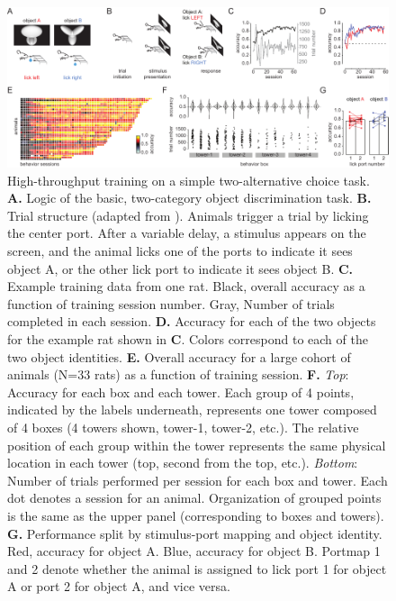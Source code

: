 \begin{figure}[t!]
    \includegraphics[width=\textwidth]{figures/chapter_1/fig_1-2_basic_training/fig_1-2_basic_training.pdf}
    \vspace{.1in}
    \caption[High-throughput training]{High-throughput training on a simple two-alternative choice task. 
    \textbf{A.} Logic of the basic, two-category object discrimination task. 
    \textbf{B.} Trial structure (adapted from \cite{Zoccolan2009}). Animals trigger a trial by licking the center port. After a variable delay, a stimulus appears on the screen, and the animal licks one of the ports to indicate it sees object A, or the other lick port to indicate it sees object B. 
    \textbf{C.} Example training data from one rat. Black, overall accuracy as a function of training session number. Gray, Number of trials completed in each session. 
    \textbf{D.} Accuracy for each of the two objects for the example rat shown in \textbf{C}. Colors correspond to each of the two object identities.
    \textbf{E.} Overall accuracy for a large cohort of animals (N=33 rats) as a function of training session. 
    \textbf{F.} \textit{Top}: Accuracy for each box and each tower. Each group of 4 points, indicated by the labels underneath, represents one tower composed of 4 boxes (4 towers shown, tower-1, tower-2, etc.). The relative position of each group within the tower represents the same physical location in each tower (top, second from the top, etc.). \textit{Bottom}: Number of trials performed per session for each box and tower. Each dot denotes a session for an animal. Organization of grouped points is the same as the upper panel (corresponding to boxes and towers). 
    \textbf{G.} Performance split by stimulus-port mapping and object identity. Red, accuracy for object A. Blue, accuracy for object B. Portmap 1 and 2 denote whether the animal is assigned to lick port 1 for object A or port 2 for object A, and vice versa.
    \label{fig:basic_training}}
\end{figure}

